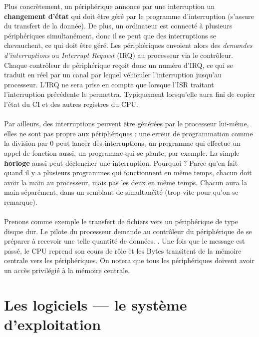 \documentclass[12pt,a4paper]{report}
\begin{document}
Plus concrètement, un périphérique annonce par une interruption un \textbf{changement d'état} qui doit être géré par le programme d'interruption (s'assure du transfert de la donnée). De plus, un ordinateur est connecté à plusieurs périphériques simultanément, donc il se peut que des interruptions se chevauchent, ce qui doit être géré. Les périphériques envoient alors des \textit{demandes d'interruptions} ou \textit{Interrupt Request} (IRQ) au processeur via le contrôleur. Chaque contrôleur de périphérique reçoit donc un numéro d'IRQ, ce qui se traduit en réel par un canal par lequel véhiculer l'interruption jusqu'au processeur. L'IRQ ne sera prise en compte que lorsque l'ISR traitant l'interruption précédente le permettra. Typiquement lorsqu'elle aura fini de copier l'état du CI et des autres registres du CPU. \\
\\
Par ailleurs, des interruptions peuvent être générées par le processeur lui-même, elles ne sont pas propre aux périphériques : une erreur de programmation comme la division par 0 peut lancer des interruptions, un programme qui effectue un appel de fonction aussi, un programme qui se plante, par exemple. La simple \textbf{horloge} aussi peut déclencher une interruption. Pourquoi ? Parce qu'en fait quand il y a plusieurs programmes qui fonctionnent en même temps, chacun doit avoir la main au processeur, mais pas les deux en même temps. Chacun aura la main séparément, dans un semblant de simultanéité (trop vite pour qu'on se remarque). \\
\\
Prenons comme exemple le transfert de fichiers vers un périphérique de type disque dur. Le pilote du processeur demande au contrôleur du périphérique de se préparer à recevoir une telle quantité de données. . Une fois que le message est passé, le CPU reprend son cours de rôle et les Bytes transitent de la mémoire centrale vers les périphériques. On notera que tous les périphériques doivent avoir un accès privilégié à la mémoire centrale.

\chapter{Les logiciels --- le système d'exploitation}
\end{document}
